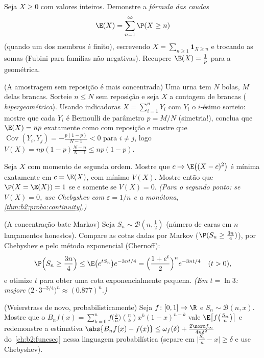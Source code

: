 \begin{exercise}[$\star\star$]\label{exo:b2:randomvar:4}
Seja $X \geq 0$ com valores inteiros. Demonstre a \emph{fórmula das caudas}
\[
\E(X) = \sum_{n=1}^{\infty} \P(X \geq n)
\]
(quando um dos membros é finito), escrevendo $X =
\sum_{n\geq1}\mathbf{1}_{X \geq n}$ e trocando as somas
(Fubini para famílias não negativas). Recupere $\E(X) = \frac1p$ para
a  geométrica.
\end{exercise}

\begin{exercise}[$\star\star$]\label{exo:b2:randomvar:5}
(A amostragem sem reposição é mais concentrada) Uma urna tem $N$
bolas, $M$ delas brancas. Sorteie $n \leq N$ sem reposição e
seja $X$ a contagem de brancas ( \emph{hipergeométrica}). Usando
indicadoras $X = \sum_{i=1}^n Y_i$ com $Y_i$ o $i$-ésimo sorteio:
mostre que cada $Y_i$ é Bernoulli de parâmetro $p = M/N$ (simetria!),
conclua que $\E(X) = np$ exatamente como com reposição e mostre que
$\operatorname{Cov}(Y_i, Y_j) = -\frac{p(1-p)}{N-1} < 0$ para $i
\neq j$, logo $V(X) = np(1-p)\frac{N - n}{N - 1} \leq np(1-p)$.
\end{exercise}

\begin{exercise}[$\star\star$]\label{exo:b2:randomvar:6}
Seja $X$ com momento de segunda ordem. Mostre que $c \mapsto \E\bigl((X -
c)^2\bigr)$ é mínima exatamente em $c = \E(X)$, com mínimo
$V(X)$. Mostre então que $\P(X = \E(X)) = 1$ se e somente se $V(X) =
0$. \emph{(Para o segundo ponto: se $V(X) = 0$, use Chebyshev
com $\varepsilon = 1/n$ e a  monótona,
\cref{thm:b2:proba:continuity}.)}
\end{exercise}

\begin{exercise}[$\star\star\star$]\label{exo:b2:randomvar:7}
(A concentração bate Markov) Seja $S_n \sim \mathcal{B}(n,
\frac12)$ (número de caras em $n$ lançamentos honestos). Compare as
cotas dadas por Markov ($\P(S_n \geq \frac{3n}{4})$), por Chebyshev
e pelo método exponencial (Chernoff):
\[
\P\Bigl(S_n \geq \frac{3n}4\Bigr)
\leq \E\bigl(e^{tS_n}\bigr)e^{-3nt/4}
= \Bigl(\frac{1 + e^t}{2}\Bigr)^n e^{-3nt/4}
\quad (t > 0),
\]
e otimize $t$ para obter uma cota exponencialmente pequena. \emph{(Em
$t = \ln 3$: majore $\bigl(2\cdot 3^{-3/4}\bigr)^n \approx
(0.877)^n$.)}
\end{exercise}

\begin{exercise}[$\star\star\star$]\label{exo:b2:randomvar:8}
(Weierstrass de novo, probabilisticamente) Seja $f \colon [0,1] \to \R$
 e $S_n \sim \mathcal{B}(n, x)$. Mostre que o
 $B_nf(x) = \sum_{k=0}^n f\bigl(\frac
kn\bigr)\binom nk x^k(1-x)^{n-k}$ vale
$\E\bigl[f\bigl(\frac{S_n}{n}\bigr)\bigr]$ e redemonstre a
estimativa $\abs{B_nf(x) - f(x)} \leq \omega_f(\delta) +
\frac{2\norm f_\infty}{4n\delta^2}$ do~\cref{ch:b2:funcseq} nessa
linguagem probabilística (separe em $\bigl|\frac{S_n}{n} -
x\bigr| \geq \delta$ e use Chebyshev).
\end{exercise}

